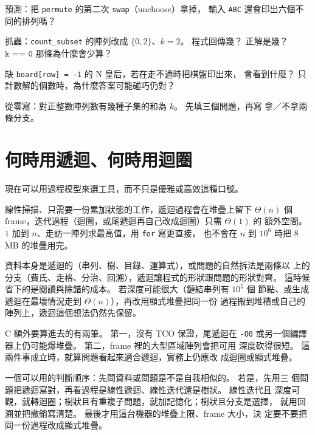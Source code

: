 
\begin{drills}[label=drills:rec-backtrack]
\item 預測：把 \texttt{permute} 的第二次 \texttt{swap}（unchoose）拿掉，
輸入 \texttt{ABC} 還會印出六個不同的排列嗎？
\item 抓蟲：\texttt{count\_subset} 的陣列改成 $\{0, 2\}$、$k = 2$。
程式回傳幾？ 正解是幾？ $\texttt{k == 0}$ 那條為什麼會少算？
\item 缺 \texttt{board[row] = -1} 的 N 皇后，若在走不通時把棋盤印出來，
會看到什麼？ 只計數解的個數時，為什麼答案可能碰巧仍對？
\item 從零寫：對正整數陣列數有幾種子集的和為 $k$。 先填三個問題，再寫
拿／不拿兩條分支。
\end{drills}

\section{何時用遞迴、何時用迴圈}
\label{sec:rec-when}

現在可以用過程模型來選工具，而不只是優雅或高效這種口號。

線性掃描、只需要一份累加狀態的工作，遞迴過程會在堆疊上留下 $\Theta(n)$
個 frame，迭代過程（迴圈，或尾遞迴再自己改成迴圈）只需 $\Theta(1)$ 的
額外空間。 $1$ 加到 $n$、走訪一陣列求最高值，用 \texttt{for} 寫更直接，
也不會在 $n$ 到 $10^6$ 時把 $8$ MB 的堆疊用完。

資料本身是遞迴的（串列、樹、目錄、運算式），或問題的自然拆法是兩條以
上的分支（費氏、走格、分治、回溯），遞迴讓程式的形狀跟問題的形狀對齊。
這時候省下的是閱讀與除錯的成本。 若深度可能很大（鏈結串列有 $10^5$ 個
節點、或生成遞迴在最壞情況走到 $\Theta(n)$），再改用顯式堆疊把同一份
過程搬到堆積或自己的陣列上，遞迴這個想法仍然先保留。

C 額外要算進去的有兩筆。 第一，沒有 TCO 保證，尾遞迴在 \texttt{-O0}
或另一個編譯器上仍可能爆堆疊。 第二，frame 裡的大型區域陣列會把可用
深度砍得很短。 這兩件事成立時，就算問題看起來適合遞迴，實務上仍應改
成迴圈或顯式堆疊。

一個可以用的判斷順序：先問資料或問題是不是自我相似的。 若是，先用三
個問題把遞迴寫對，再看過程是線性遞迴、線性迭代還是樹狀。 線性迭代且
深度可觀，就轉迴圈；樹狀且有重複子問題，就加記憶化；樹狀且分支是選擇，
就用回溯並把撤銷寫清楚。 最後才用這台機器的堆疊上限、frame 大小，決
定要不要把同一份過程改成顯式堆疊。

